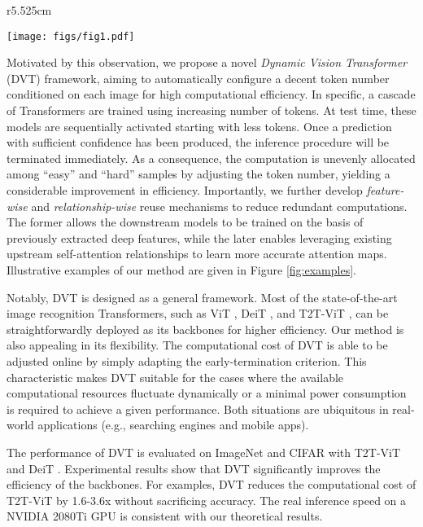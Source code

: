 \documentclass{article}
\begin{document}
\begin{wrapfigure}{r}{5.525cm}
    \vskip -0.25in
    \begin{minipage}[t]{\linewidth}
    \centering
    \hspace{-2.5ex}
    \texttt{[image: figs/fig1.pdf]}	
    \vskip -0.125in
    \caption{Examples for DVT.
    \label{fig:examples}}  
    \end{minipage}
    \vskip -0.2in
\end{wrapfigure}
Motivated by this observation, we propose a novel \emph{Dynamic Vision Transformer} (DVT) framework, aiming to automatically configure a decent token number conditioned on each image for high computational efficiency. In specific, a cascade of Transformers are trained using increasing number of tokens. At test time, these models are sequentially activated starting with less tokens. Once a prediction with sufficient confidence has been produced, the inference procedure will be terminated immediately. As a consequence, the computation is unevenly allocated among ``easy'' and ``hard'' samples by adjusting the token number, yielding a considerable improvement in efficiency. Importantly, we further develop \emph{feature-wise} and \emph{relationship-wise} reuse mechanisms to reduce redundant computations. The former allows the downstream models to be trained on the basis of previously extracted deep features, while the later enables leveraging existing upstream self-attention relationships to learn more accurate attention maps. Illustrative examples of our method are given in Figure \ref{fig:examples}.

Notably, DVT is designed as a general framework. Most of the state-of-the-art image recognition Transformers, such as ViT \cite{dosovitskiy2021an}, DeiT \cite{touvron2020training}, and T2T-ViT \cite{yuan2021tokens}, can be straightforwardly deployed as its backbones for higher efficiency. Our method is also appealing in its flexibility. The computational cost of DVT is able to be adjusted online by simply adapting the early-termination criterion. This characteristic makes DVT suitable for the cases where the available computational resources fluctuate dynamically or a minimal power consumption is required to achieve a given performance. Both situations are ubiquitous in real-world applications (e.g., searching engines and mobile apps).

The performance of DVT is evaluated on ImageNet \cite{5206848} and CIFAR \cite{krizhevsky2009learning} with T2T-ViT \cite{yuan2021tokens} and DeiT \cite{touvron2020training}. Experimental results show that DVT significantly improves the efficiency of the backbones. For examples, DVT reduces the computational cost of T2T-ViT by 1.6-3.6x without sacrificing accuracy. The real inference speed on a NVIDIA 2080Ti GPU is consistent with our theoretical results.
\end{document}
